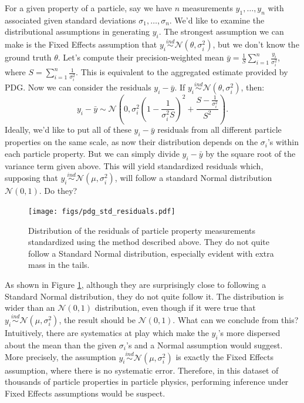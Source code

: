 \documentclass[12pt]{article}
\begin{document}
For a given property of a particle, say we have $n$ measurements $y_1,\ldots,y_n$ with associated given standard deviations $\sigma_1,\ldots,\sigma_n$. We'd like to examine the distributional assumptions in generating $y_i$. The strongest assumption we can make is the Fixed Effects assumption that $y_i\overset{ind}{\sim}\mathcal{N}(\theta,\sigma_i^2)$, but we don't know the ground truth $\theta$. Let's compute their precision-weighted mean $\bar{y}=\frac{1}{S}\sum_{i=1}^n\frac{y_i}{\sigma_i^2}$, where $S=\sum_{i=1}^n \frac{1}{\sigma_i^2}$. This is equivalent to the aggregated estimate provided by PDG. Now we can consider the residuals $y_i-\bar{y}$. If $y_i\overset{ind}{\sim}\mathcal{N}(\theta,\sigma_i^2)$, then:
\[y_i-\bar{y}\sim \mathcal{N}\left(0, \sigma_i^2(1-\frac{1}{\sigma_i^2S})^2+\frac{S-\frac{1}{\sigma_i^2}}{S^2}\right).\]
Ideally, we'd like to put all of these $y_i-\bar{y}$ residuals from all different particle properties on the same scale, as now their distribution depends on the $\sigma_i$'s within each particle property. But we can simply divide $y_i-\bar{y}$ by the square root of the variance term given above. This will yield standardized residuals which, supposing that $y_i\overset{ind}{\sim} \mathcal{N}(\mu,\sigma_i^2)$, will follow a standard Normal distribution $\mathcal{N}(0,1)$. Do they?

\begin{figure}[H]
\centering
\texttt{[image: figs/pdg\_std\_residuals.pdf]}
\caption{Distribution of the residuals of particle property measurements standardized using the method described above. They do not quite follow a Standard Normal distribution, especially evident with extra mass in the tails.}
\label{fig:pdg-std-residuals}
\end{figure}

As shown in Figure \ref{fig:pdg-std-residuals}, although they are surprisingly close to following a Standard Normal distribution, they do not quite follow it. The distribution is wider than an $\mathcal{N}(0,1)$ distribution, even though if it were true that $y_i\overset{ind}{\sim} \mathcal{N}(\mu,\sigma_i^2)$, the result should be $\mathcal{N}(0,1)$. What can we conclude from this? Intuitively, there are systematics at play which make the $y_i$'s more dispersed about the mean than the given $\sigma_i$'s and a Normal assumption would suggest. More precisely, the assumption $y_i\overset{ind}{\sim} \mathcal{N}(\mu,\sigma_i^2)$ is exactly the Fixed Effects assumption, where there is no systematic error. Therefore, in this dataset of thousands of particle properties in particle physics, performing inference under Fixed Effects assumptions would be suspect.
\end{document}
